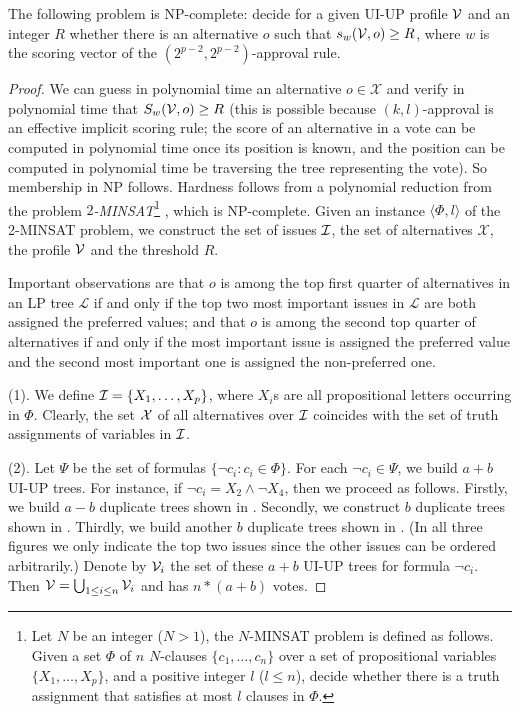 \begin{thm}
The following problem is NP-complete: decide for a given UI-UP profile 
$\mathcal{V}$ and an integer $R$ whether there is an alternative $o$ such that 
$s_w(\mathcal{V},o) \geq R$, where $w$ is the scoring vector of the $(2^{p-2},
2^{p-2})$-approval rule.
\end{thm}
\begin{proof}
        We can guess in polynomial time an alternative $o \in \mathcal{X}$ and
        verify in polynomial time that $S_w(\mathcal{V}, o) \geq R$ (this is possible 
because $(k,l)$-approval is an effective implicit scoring rule; the score of an alternative in
a vote can be computed in polynomial time once its position is known, and 
the position can be computed in polynomial time be traversing the tree 
representing the vote).  So membership in NP follows.
        Hardness follows from a polynomial reduction from the
        problem $2$\textit{-MINSAT}\footnote{Let $N$ be an integer ($N>1$),
				the $N$-MINSAT problem
        is defined as follows.  Given a set $\Phi$ of $n$ $N$-clauses
        $\{ c_1,\ldots,c_n \}$ over a set of propositional variables
        $\{ X_1,\ldots,X_p \}$,
        and a positive
        integer $l$ ($l \leq n$), decide whether there is a truth assignment that
        satisfies at most $l$ clauses in $\Phi$.} \cite{Kohli:2maxsat}, which is NP-complete.
        Given an instance $\langle \Phi, l \rangle$ of the 2-MINSAT problem,
we construct the set of issues
        $\mathcal{I}$, the set of alternatives $\mathcal{X}$, the profile $\mathcal{V}$ and the threshold $R$.

        Important observations are that $o$ is among the
				top first quarter of alternatives in an LP tree 
$\mathcal{L}$ if and only if the top two most important issues in $\mathcal{L}$ 
are both assigned the preferred values; and that $o$ is among the second top 
quarter of alternatives if and only if the most important issue is assigned 
the preferred value and the second most important one is assigned the 
non-preferred one.
				
\noindent
(1). We define $\mathcal{I} = \{ X_1,\ldots,X_p \}$, where $X_i$s are all propositional
letters occurring in $\Phi$. Clearly, the set $\mathcal{X}$ of all alternatives over 
$\mathcal{I}$ coincides with the set of truth assignments of variables in $\mathcal{I}$.

\noindent
(2). Let $\Psi$ be the set of formulas $\{ \neg c_i:c_i \in \Phi \}$.  
For each $\neg c_i \in \Psi$, we build $a+b$ UI-UP trees. For instance, 
if $\neg c_i = X_2 \land \neg X_4$, then we proceed as follows.
Firstly, we build $a-b$ duplicate trees shown in
. Secondly, we construct $b$ duplicate trees shown in
. Thirdly, we build another $b$ duplicate trees shown in
. (In all three figures we only indicate the top two issues 
since the other issues can be ordered arbitrarily.) Denote by $\mathcal{V}_i$ the 
set of these $a+b$ UI-UP trees for formula $\neg c_i$. Then $\mathcal{V} = \bigcup_{1 
\leq i \leq n} \mathcal{V}_i$ and has $n*(a+b)$ votes.


\end{proof}
